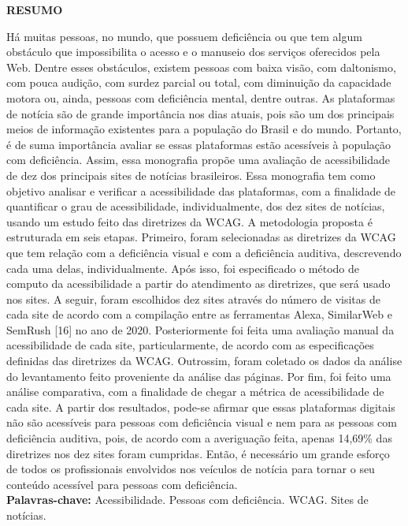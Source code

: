 \documentclass[a4paper]{article}
\begin{document}
\begin{titlepage}
	\begin{center}
		{\large \textbf{RESUMO}}\\[1cm]
	\end{center}
	\fontsize{12pt}{0pt}\selectfont
	\onehalfspacing
	Há muitas pessoas, no mundo, que possuem deficiência ou que tem algum obstáculo que impossibilita o acesso e o manuseio dos serviços oferecidos pela Web. Dentre esses obstáculos, existem pessoas com baixa visão, com daltonismo, com pouca audição, com surdez parcial ou total, com diminuição da capacidade motora ou, ainda, pessoas com deficiência mental, dentre outras. As plataformas de notícia são de grande importância nos dias atuais, pois são um dos principais meios de informação existentes para a população do Brasil e do mundo. Portanto, é de suma importância avaliar se essas plataformas estão acessíveis à população com deficiência. Assim, essa monografia propõe uma avaliação de acessibilidade de dez dos principais sites de notícias brasileiros. Essa monografia tem como objetivo analisar e verificar a acessibilidade das plataformas, com a finalidade de quantificar o grau de acessibilidade, individualmente, dos dez sites de notícias, usando um estudo feito das diretrizes da WCAG. A metodologia proposta é estruturada em seis etapas. Primeiro, foram selecionadas as diretrizes da WCAG que tem relação com a deficiência visual e com a deficiência auditiva, descrevendo cada uma delas, individualmente. Após isso, foi especificado o método de computo da acessibilidade a partir do atendimento as diretrizes, que será usado nos sites. A seguir, foram escolhidos dez sites através do número de visitas de cada site de acordo com a compilação entre as ferramentas Alexa, SimilarWeb e SemRush [16] no ano de 2020. Posteriormente foi feita uma avaliação manual da acessibilidade de cada site, particularmente, de acordo com as especificações definidas das diretrizes da WCAG. Outrossim, foram coletado os dados da análise do levantamento feito proveniente da análise das páginas. Por fim, foi feito uma análise comparativa, com a finalidade de chegar a métrica de acessibilidade de cada site. A partir dos resultados, pode-se afirmar que essas plataformas digitais não são acessíveis para pessoas com deficiência visual e nem para as pessoas com deficiência auditiva, pois, de acordo com a averiguação feita, apenas 14,69\% das diretrizes nos dez sites foram cumpridas. Então, é necessário um grande esforço de todos os profissionais envolvidos nos veículos de notícia para tornar o seu conteúdo acessível para pessoas com deficiência.\\[1cm]
	{\large \textbf{Palavras-chave: }}Acessibilidade. Pessoas com deficiência. WCAG. Sites de notícias.\\[1cm]
\end{titlepage}
\end{document}
